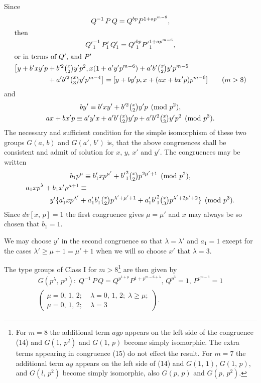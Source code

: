 \documentclass[oneside]{article}
\begin{document}
Since
\begin{gather*}
Q^{-1}\, P\, Q = Q^{bp} P^{1 + ap^{m-6}}, \\
\intertext{then}
{Q'}_1^{-1}\, P'_1\, Q'_1 = {Q'}_1^{bp} {P'}_1^{1 + ap^{m-6}}, \\
\intertext{or in terms of $Q'$, and $P'$}
\begin{aligned}
  \bigl[y + b'xy'p &+ b'^2\tbinom{x}{2}y'p^2, x(1 + a'y'p^{m-6}) + a'b'\tbinom{x}{2}y'p^{m-5} \\
    &+ a'b'^2\tbinom{x}{3}y'p^{m-4}\bigr] = [y + by'p, x + (ax + bx'p)p^{m-6}] \qquad (m > 8)
\end{aligned}
\end{gather*}
\noindent and
\begin{gather}
by' \equiv b'xy' + b'^2\tbinom{x}{2}y'p \pmod{p^2}, \\ %
ax + bx'p \equiv a'y'x + a'b'\tbinom{x}{2}y'p + a'b'^2\tbinom{x}{3}y'p^2 \pmod{p^3}. %
\end{gather}
\noindent The necessary and sufficient condition for the simple
isomorphism of these two groups $G(a,\, b)$ and $G(a',\, b')$ is, that
the above congruences shall be consistent and admit of solution
for $x$, $y$, $x'$ and $y'$. The congruences may be written
\begin{gather*}
b_1 p^\mu \equiv b'_1 xp^{\mu'} + {b'}_1^2\tbinom{x}{2}p^{2\mu' + 1} \pmod{p^2}, \\
\begin{aligned}
  a_1 xp^{\lambda} + b_1 x'p^{\mu + 1} &\equiv \\
    y'\{a'_1 xp^{\lambda'} &+ a'_1 b'_1\tbinom{x}{2}p^{\lambda'+\mu'+1}
    + a'_1 {b'}_1^2\tbinom{x}{3}p^{\lambda'+2\mu'+2}\} \pmod{p^3}.
\end{aligned}
\end{gather*}
\noindent Since $dv[x,\, p] = 1$ the first congruence gives $\mu =
\mu'$ and $x$ may always be so chosen that $b_1 = 1$.

We may choose $y'$ in the second congruence so that $\lambda =
\lambda'$ and $a_1 = 1$ except for the cases $\lambda' \ge \mu + 1
= \mu' + 1$ when we will so choose $x'$ that $\lambda = 3$.

The type groups of Class I for $m > 8$\footnote{For $m = 8$ the
additional term $ayp$ appears on the left side of the congruence
(14) and $G(1,\, p^2)$ and $G(1,\, p)$ become simply isomorphic. The
extra terms appearing in congruence (15) do not effect the result.
For $m = 7$ the additional term $ay$ appears on the left side of
(14) and $G(1,\, 1)$, $G(1,\, p)$, and $G(l,\, p^2)$ become simply
isomorphic, also $G(p,\, p)$ and $G(p,\, p^2)$.} are then given by
\begin{multline}
G(p^\lambda,\, p^\mu):\; Q^{-1}\, P\, Q = Q^{p^{1+\mu}}
  P^{1+p^{m-6+\lambda}},\, Q^{p^3} = 1,\, P^{p^{m-3}} = 1 \\
\left(
  \begin{aligned}
    \mu = 0,\, 1,\, 2;\;& \lambda = 0,\, 1,\, 2;\; \lambda \ge \mu; \\
    \mu = 0,\, 1,\, 2;\;& \lambda = 3
  \end{aligned} \right)
\tag{I}.
\end{multline}
\end{document}
